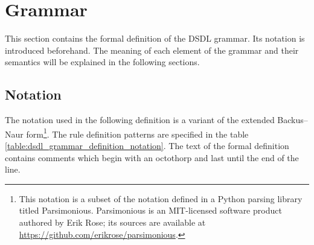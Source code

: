 \section{Grammar}

This section contains the formal definition of the DSDL grammar.
Its notation is introduced beforehand.
The meaning of each element of the grammar and their semantics will be explained in the following sections.

\subsection{Notation}

The notation used in the following definition is a variant of the extended Backus--Naur
form\footnote{This notation is a subset of the notation defined in a Python parsing library titled Parsimonious.
Parsimonious is an MIT-licensed software product authored by Erik Rose;
its sources are available at \url{https://github.com/erikrose/parsimonious}.}.
The rule definition patterns are specified in the table \ref{table:dsdl_grammar_definition_notation}.
The text of the formal definition contains comments which begin with an octothorp and last until the end of the line.

